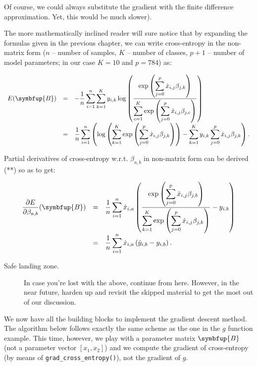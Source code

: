 \documentclass[10pt,b5paper,krantz1]{krantz}
\renewcommand{\mathbf}[1]{\symbfup{#1}}
\begin{document}
Of course, we could always substitute the gradient
with the finite difference approximation. Yet, this would be much slower).

The more mathematically inclined reader will sure notice that
by expanding the formulas given
in the previous chapter, we can write cross-entropy
in the non-matrix form
(\(n\) -- number of samples, \(K\) -- number of classes,
\(p+1\) -- number of model parameters;
in our case \(K=10\) and \(p=784\)) as:

\[
\begin{array}{rcl}
E(\mathbf{B}) &=& -\displaystyle\frac{1}{n} \displaystyle\sum_{i=1}^n \displaystyle\sum_{k=1}^K y_{i,k}
\log\left(
\frac{
\exp\left(
\displaystyle\sum_{j=0}^p \dot{x}_{i,j} \beta_{j,k}
\right)
}{
\displaystyle\sum_{c=1}^K \exp\left(
\displaystyle\sum_{j=0}^p \dot{x}_{i,j} \beta_{j,c}
\right)
}
\right)\\
&=&
\displaystyle\frac{1}{n} \displaystyle\sum_{i=1}^n
\left(
\log \left(\displaystyle\sum_{k=1}^K \exp\left(
\displaystyle\sum_{j=0}^p \dot{x}_{i,j} \beta_{j,k}
\right)\right)
- \displaystyle\sum_{k=1}^K y_{i,k} \displaystyle\sum_{j=0}^p \dot{x}_{i,j} \beta_{j,k}
\right).
\end{array}
\]

Partial derivatives of cross-entropy w.r.t. \(\beta_{a,b}\) in non-matrix form
can be derived (**) so as to get:

\[
\begin{array}{rcl}
\displaystyle\frac{\partial E}{\partial \beta_{a,b}}(\mathbf{B}) &=&
\displaystyle\frac{1}{n} \displaystyle\sum_{i=1}^n \dot{x}_{i,a}
\left(
\frac{
\exp\left(
\displaystyle\sum_{j=0}^p \dot{x}_{i,j} \beta_{j,b}
\right)
}{
\displaystyle\sum_{k=1}^K \exp\left(
\displaystyle\sum_{j=0}^p \dot{x}_{i,j} \beta_{j,k}
\right)
}
- y_{i,b}
\right)\\
&=&
\displaystyle\frac{1}{n} \displaystyle\sum_{i=1}^n \dot{x}_{i,a}
\left(
\hat{y}_{i,b} - y_{i,b}
\right).
\end{array}
\]

\begin{description}
\item[Safe landing zone.]
In case you're lost with the above, continue from here.
However, in the near future, harden up and revisit the skipped material
to get the most out of our discussion.
\end{description}

We now have all the building blocks to
implement the gradient descent method.
The algorithm below follows exactly the same scheme as the one in the
\(g\) function example. This time, however, we play with a parameter matrix
\(\mathbf{B}\) (not a parameter vector \([x_1, x_2]\)) and we compute
the gradient of cross-entropy (by means of \texttt{grad\_cross\_entropy()}),
not the gradient of \(g\).
\end{document}
